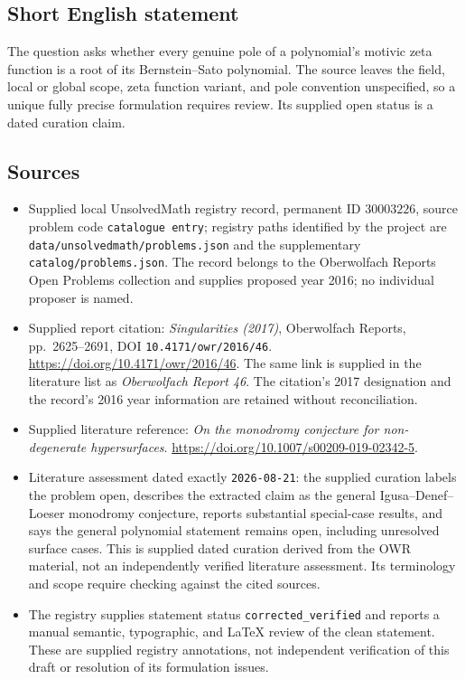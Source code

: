 \documentclass[11pt]{article}
\begin{document}
\subsection{Short English statement}
The question asks whether every genuine pole of a polynomial's motivic zeta function is a root of its Bernstein--Sato polynomial. The source leaves the field, local or global scope, zeta function variant, and pole convention unspecified, so a unique fully precise formulation requires review. Its supplied open status is a dated curation claim.
\subsection{Sources}
\begin{itemize}
\item Supplied local UnsolvedMath registry record, permanent ID \(30003226\), source problem code \texttt{catalogue entry}; registry paths identified by the project are \texttt{data/unsolvedmath/problems.json} and the supplementary \texttt{catalog/problems.json}. The record belongs to the Oberwolfach Reports Open Problems collection and supplies proposed year 2016; no individual proposer is named.
\item Supplied report citation: \emph{Singularities (2017)}, Oberwolfach Reports, pp.\ 2625--2691, DOI \texttt{10.4171/owr/2016/46}. \url{https://doi.org/10.4171/owr/2016/46}. The same link is supplied in the literature list as \emph{Oberwolfach Report 46}. The citation's 2017 designation and the record's 2016 year information are retained without reconciliation.
\item Supplied literature reference: \emph{On the monodromy conjecture for non-degenerate hypersurfaces}. \url{https://doi.org/10.1007/s00209-019-02342-5}.
\item Literature assessment dated exactly \texttt{2026-08-21}: the supplied curation labels the problem open, describes the extracted claim as the general Igusa--Denef--Loeser monodromy conjecture, reports substantial special-case results, and says the general polynomial statement remains open, including unresolved surface cases. This is supplied dated curation derived from the OWR material, not an independently verified literature assessment. Its terminology and scope require checking against the cited sources.
\item The registry supplies statement status \texttt{corrected\_verified} and reports a manual semantic, typographic, and LaTeX review of the clean statement. These are supplied registry annotations, not independent verification of this draft or resolution of its formulation issues.
\end{itemize}
\end{document}
